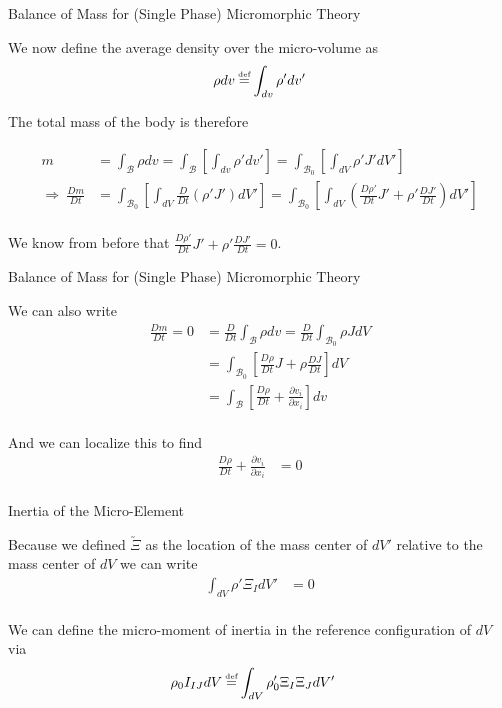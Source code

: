 \documentclass[11pt]{beamer}
\newcommand{\VEC}[1]{\utilde{#1}}
\newcommand\defeq{\mathrel{\stackrel{\makebox[0pt]{\mbox{\normalfont\tiny def}}}{=}}}
\begin{document}
\begin{frame}{Balance of Mass for (Single Phase) Micromorphic Theory}

We now define the average density over the micro-volume as
\begin{align*}
\rho dv &\defeq \int_{dv} \rho' dv'\\
\end{align*}

The total mass of the body is therefore

\begin{align*}
m &= \int_{\mathcal{B}} \rho dv = \int_{\mathcal{B}} \left[\int_{dv} \rho' dv'\right] = \int_{\mathcal{B}_0} \left[\int_{dV} \rho' J' dV'\right]\\
\Rightarrow\ \frac{Dm}{Dt} &= \int_{\mathcal{B}_0} \left[\int_{dV} \frac{D}{Dt} \left(\rho' J' \right) dV' \right] = \int_{\mathcal{B}_0} \left[\int_{dV} \left(\frac{D\rho'}{Dt}J' + \rho'\frac{D J'}{Dt} \right) dV' \right]\\
\end{align*}

We know from before that $\frac{D\rho'}{Dt}J' + \rho'\frac{D J'}{Dt}  = 0$.

\end{frame}

\begin{frame}{Balance of Mass for (Single Phase) Micromorphic Theory}

We can also write
\begin{align*}
\frac{Dm}{Dt} = 0 &= \frac{D}{Dt} \int_{\mathcal{B}} \rho dv = \frac{D}{Dt} \int_{\mathcal{B}_0} \rho J dV\\
&= \int_{\mathcal{B}_0} \left[\frac{D\rho}{Dt} J + \rho \frac{DJ}{Dt}\right] dV\\
&= \int_{\mathcal{B}} \left[\frac{D\rho}{Dt} + \frac{\partial v_i}{\partial x_i}\right] dv\\
\end{align*}

And we can localize this to find
\begin{align*}
\frac{D\rho}{Dt} + \frac{\partial v_i}{\partial x_i} &= 0\\
\end{align*}
\end{frame}

\begin{frame}{Inertia of the Micro-Element}

Because we defined $\VEC{\Xi}$ as the location of the mass center of $dV'$ relative to the mass center of $dV$ we can write
\begin{align*}
\int_{dV} \rho' \Xi_I dV' &= 0\\
\end{align*}

We can define the micro-moment of inertia in the reference configuration of $dV$ via
\begin{align*}
\rho_0 I_{IJ} dV &\defeq \int_{dV} \rho_0' \Xi_{I} \Xi_{J} dV'
\end{align*}
 
\end{frame}
\end{document}
